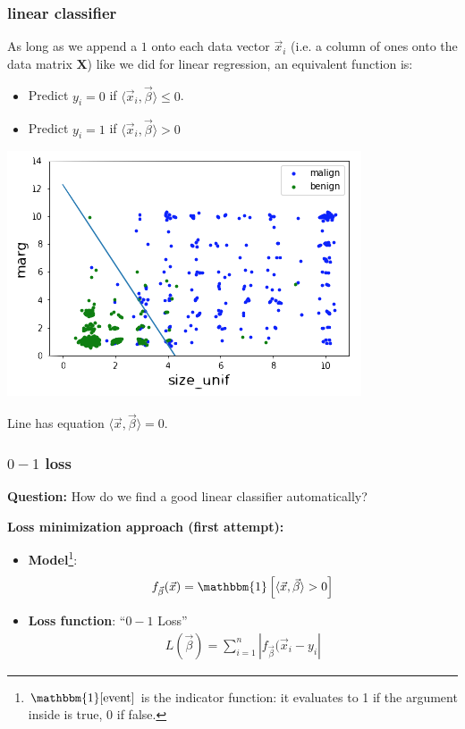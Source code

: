 \documentclass[handout,compress]{beamer}
\newcommand{\bv}[1]{\mathbf{#1}}
\begin{document}
\begin{frame}
	\frametitle{linear classifier}
	\begin{center}
		As long as we append a $1$ onto each data vector $\vec{x}_i$ (i.e. a column of ones onto the data matrix $\bv{X}$) like we did for linear regression, an equivalent function is:
		\begin{itemize}
			\item Predict $y_i = 0$ if $\langle \vec{x}_i,\vec{\beta}\rangle \leq 0$.
			\item Predict $y_i = 1$ if $\langle \vec{x}_i,\vec{\beta}\rangle > 0$
		\end{itemize} 
		\includegraphics[width=.5\textwidth]{linear_classifier.png}
		
		\vspace{-.5em}
		Line has equation $\langle \vec{x},\vec{\beta}\rangle  = 0$. 
	\end{center}
\end{frame}

\begin{frame}
	\frametitle{$0-1$ loss}
	\textbf{Question:} How do we find a good linear classifier automatically?
	
	\textbf{Loss minimization approach (first attempt):}
	\begin{itemize}
		\item \textbf{Model}\footnote{$\mathbbm{1}[\text{event}]$ is the indicator function: it evaluates to 1 if the argument inside is true, 0 if false.}: 
		\begin{align*}
			f_{\vec{\beta}}(\vec{x}) = \mathbbm{1}\left[\langle \vec{x},\vec{\beta}\rangle > 0\right]
		\end{align*}
		\item \textbf{Loss function}: ``$0-1$ Loss''
		\begin{align*}
		L(\vec{\beta}) = \sum_{i=1}^n |f_{\vec{\beta}}(\vec{x}_i -y_i|
		\end{align*}
	\end{itemize}
\end{frame}
\end{document}
